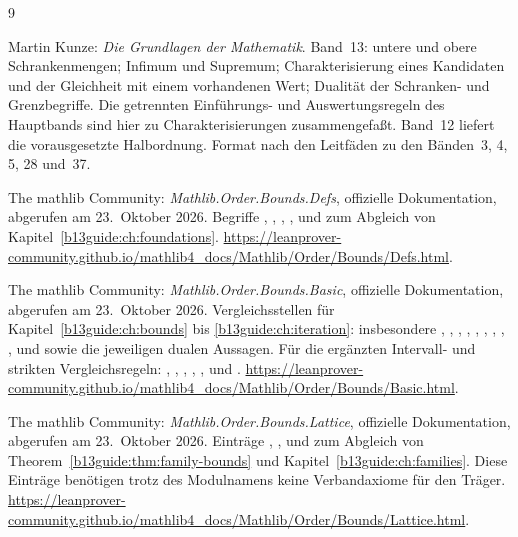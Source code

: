 \renewcommand{\bibname}{Quellen und Bandzuordnung}
\begin{thebibliography}{9}
\footnotesize
\setlength{\itemsep}{5pt}
\setlength{\parskip}{0pt}

Martin Kunze: \emph{Die Grundlagen der Mathematik}.
Band~13: untere und obere Schrankenmengen; Infimum und Supremum;
Charakterisierung eines Kandidaten und der Gleichheit mit einem
vorhandenen Wert; Dualität der Schranken- und Grenzbegriffe.
Die getrennten Einführungs- und Auswertungsregeln des Hauptbands
sind hier zu Charakterisierungen zusammengefaßt.
Band~12 liefert die vorausgesetzte Halbordnung.
Format nach den Leitfäden zu den Bänden~3, 4, 5, 28 und~37.

The mathlib Community: \emph{Mathlib.Order.Bounds.Defs},
offizielle Dokumentation, abgerufen am 23.~Oktober 2026.
Begriffe , , ,
,  und  zum Abgleich von
Kapitel~\ref{b13guide:ch:foundations}.
\url{https://leanprover-community.github.io/mathlib4_docs/Mathlib/Order/Bounds/Defs.html}.

The mathlib Community: \emph{Mathlib.Order.Bounds.Basic},
offizielle Dokumentation, abgerufen am 23.~Oktober 2026.
Vergleichsstellen für Kapitel~\ref{b13guide:ch:bounds} bis
\ref{b13guide:ch:iteration}: insbesondere
, ,
, ,
, ,
, ,
,  und
 sowie die jeweiligen dualen Aussagen.
Für die ergänzten Intervall- und strikten Vergleichsregeln:
, ,
, , ,
 und .
\url{https://leanprover-community.github.io/mathlib4_docs/Mathlib/Order/Bounds/Basic.html}.

The mathlib Community: \emph{Mathlib.Order.Bounds.Lattice},
offizielle Dokumentation, abgerufen am 23.~Oktober 2026.
Einträge , ,
 und
 zum Abgleich von
Theorem~\ref{b13guide:thm:family-bounds} und
Kapitel~\ref{b13guide:ch:families}.
Diese Einträge benötigen trotz des Modulnamens keine
Verbandaxiome für den Träger.
\url{https://leanprover-community.github.io/mathlib4_docs/Mathlib/Order/Bounds/Lattice.html}.



\end{thebibliography}

